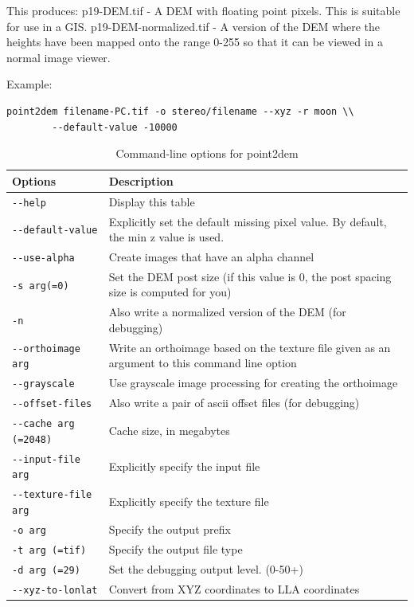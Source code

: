 This produces: 
	p19-DEM.tif - A DEM with floating point pixels. This is suitable for use in a GIS.
	p19-DEM-normalized.tif - A version of the DEM where the heights have been mapped onto the range 0-255 so that it can be viewed in a normal image viewer.

Example:
\begin{verbatim}
point2dem filename-PC.tif -o stereo/filename --xyz -r moon \\
        --default-value -10000
\end{verbatim}

\begin{longtable}{|l|p{10cm}|}
\caption{Command-line options for point2dem}
\label{tbl:point2dem}
\endfirsthead
\endhead
\endfoot
\endlastfoot
\hline
Options & Description \\ \hline \hline
\verb#--help# & Display this table \\ \hline
\verb#--default-value# & Explicitly set the default missing pixel value. By default, the min z value is used. \\ \hline
\verb#--use-alpha# & Create images that have an alpha channel \\ \hline
\verb#-s arg(=0)# & Set the DEM post size (if this value is 0, the post spacing size is computed for you) \\ \hline
\verb#-n# & Also write a normalized version of the DEM (for debugging) \\ \hline
\verb#--orthoimage arg# & Write an orthoimage based on the texture file given as an argument to this command line option \\ \hline
\verb#--grayscale# & Use grayscale image processing for creating the orthoimage \\ \hline
\verb#--offset-files# & Also write a pair of ascii offset files (for debugging) \\ \hline
\verb#--cache arg (=2048)# & Cache size, in megabytes \\ \hline
\verb#--input-file arg# & Explicitly specify the input file \\ \hline
\verb#--texture-file arg# & Explicitly specify the texture file \\ \hline
\verb#-o arg# & Specify the output prefix \\ \hline
\verb#-t arg (=tif)# & Specify the output file type \\ \hline
\verb#-d arg (=29)# & Set the debugging output level. (0-50+) \\ \hline
\verb#--xyz-to-lonlat# & Convert from XYZ coordinates to LLA coordinates \\ \hline

\end{longtable}
